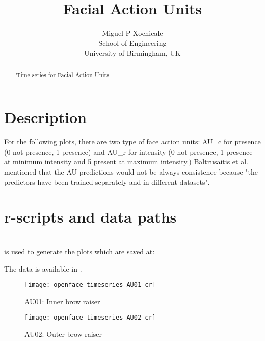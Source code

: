\documentclass[a4paper,12pt]{article}
\title{Facial Action Units}
\author{Miguel P Xochicale \\
School of Engineering\\
University of Birmingham, UK}
\begin{document}
\maketitle

\begin{abstract}
Time series for Facial Action Units. 
\end{abstract}


\section{Description}

For the following plots, there are two type of face action units: 
AU\_c for presence (0 not presence, 1 presence) and 
AU\_r for intensity (0 not presence, 1 presence at minimum intensity and 5 present at maximum intensity.)
Baltrusaitis et al. \cite{baltrusaitis2016} mentioned 
that the AU predictions would not be always consistence because 
"the predictors have been trained separately and in different datasets".



\section{r-scripts and data paths}
 \\
is used to generate the plots which are saved at: \\



The data is available in \cite{mxochicale2018}.











\begin{figure}
\centering
\texttt{[image: openface-timeseries\_AU01\_cr]}
\caption{AU01: Inner brow raiser}
\end{figure}

\begin{figure}
\centering
\texttt{[image: openface-timeseries\_AU02\_cr]}
\caption{AU02: Outer brow raiser}
\end{figure}
\end{document}
